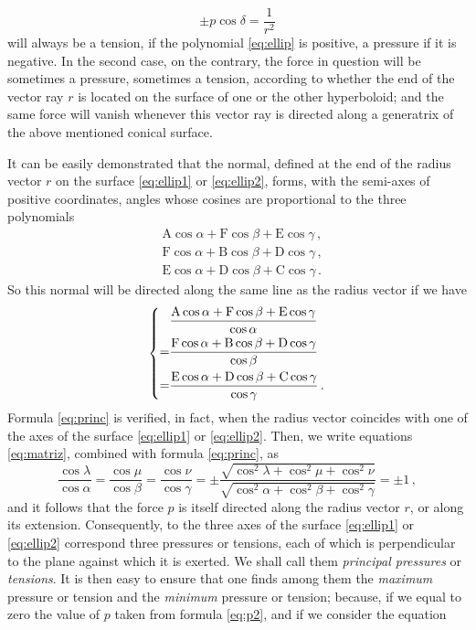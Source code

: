 \documentclass[leqno,openright,smallroyalvopaper,8pt,twoside,showtrims]{memoir}
\begin{document}
\begin{equation}
 \pm p\cos\delta = \dfrac{1}{r^2}
 \end{equation}
 will always be a tension, if the polynomial \eqref{eq:ellip} is positive, a pressure if it is negative. In the second case, on the contrary, the force in question will be sometimes a pressure, sometimes a tension, according to whether the end of the vector ray $r$ is located on the surface of one or the other hyperboloid; and the same force will vanish whenever this vector ray is directed along a generatrix of the above mentioned conical surface.

It can be easily demonstrated that the normal, defined at the end of the radius vector $r$ on the surface \eqref{eq:ellip1} or \eqref{eq:ellip2}, forms, with the semi-axes of positive coordinates, angles whose cosines are proportional to the three polynomials
\begin{align*}
&\text{A}\cos\alpha+\text{F}\cos\beta+\text{E}\cos\gamma\,,\\
&\text{F}\cos\alpha+\text{B}\cos\beta+\text{D}\cos\gamma\,,\\ 
&\text{E}\cos\alpha+\text{D}\cos\beta+\text{C}\cos\gamma\,.
\end{align*}
So this normal will be directed along the same line as the radius vector if we have
\begin{equation}\label{eq:princ}
\begin{dcases}
\begin{aligned}
&\dfrac{\text{A}\cos\alpha+\text{F}\cos\beta+\text{E}\cos\gamma}{\cos\alpha}\\
=&\dfrac{\text{F}\cos\alpha+\text{B}\cos\beta+\text{D}\cos\gamma}{\cos\beta}\\
=&\dfrac{\text{E}\cos\alpha+\text{D}\cos\beta+\text{C}\cos\gamma}{\cos\gamma}\,.
\end{aligned}
\end{dcases}
\end{equation}
Formula \eqref{eq:princ} is verified, in fact, when the radius vector coincides with one of the axes of the surface \eqref{eq:ellip1} or \eqref{eq:ellip2}. Then, we write equations \eqref{eq:matriz}, combined with formula \eqref{eq:princ}, as
\begin{equation}\label{eq:princ1}
\dfrac{\cos\lambda}{\cos\alpha}=\dfrac{\cos\mu}{\cos\beta}=\dfrac{\cos\nu}{\cos\gamma}=\pm\dfrac{\sqrt{\cos^2\lambda+\cos^2\mu+\cos^2\nu}}{\sqrt{\cos^2\alpha+\cos^2\beta+\cos^2\gamma}}=\pm 1\,,
\end{equation}
and it follows that the force $p$ is itself directed along the radius vector $r$, or along its extension. Consequently, to the three axes of the surface \eqref{eq:ellip1} or \eqref{eq:ellip2} correspond three pressures or tensions, each of which is perpendicular to the plane against which it is exerted. We shall call them \emph{principal pressures} or \emph{tensions}. It is then easy to ensure that one finds among them the \emph{maximum} pressure or tension and the \emph{minimum} pressure or tension; because, if we equal to zero the value of $p$ taken from formula \eqref{eq:p2}, and if we consider the equation
\end{document}
